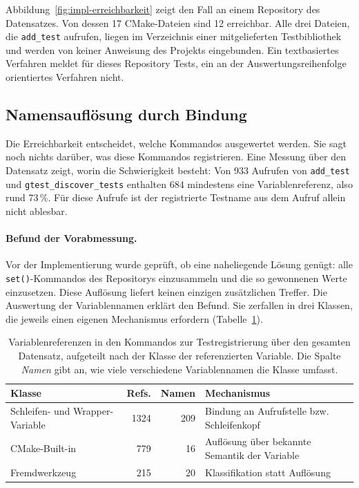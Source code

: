 \documentclass[12pt,a4paper,twoside,headsepline,parskip=half]{scrreprt}
\begin{document}
Abbildung~\ref{fig:impl-erreichbarkeit} zeigt den Fall an einem Repository des
Datensatzes. Von dessen 17 CMake-Dateien sind 12 erreichbar. Alle drei Dateien, die
\texttt{add\_test} aufrufen, liegen im Verzeichnis einer mitgelieferten Testbibliothek
und werden von keiner Anweisung des Projekts eingebunden. Ein textbasiertes Verfahren
meldet für dieses Repository Tests, ein an der Auswertungsreihenfolge orientiertes
Verfahren nicht.

\subsection{Namensauflösung durch Bindung}
\label{sec:impl-bindung}

Die Erreichbarkeit entscheidet, welche Kommandos ausgewertet werden. Sie sagt noch
nichts darüber, was diese Kommandos registrieren. Eine Messung über den Datensatz
zeigt,
worin die Schwierigkeit besteht: Von 933 Aufrufen von \texttt{add\_test} und
\texttt{gtest\_discover\_tests} enthalten 684 mindestens eine Variablenreferenz, also
rund 73\,\%. Für diese Aufrufe ist der registrierte Testname aus dem Aufruf allein
nicht ablesbar.

\paragraph{Befund der Vorabmessung.}
Vor der Implementierung wurde geprüft, ob eine naheliegende Lösung genügt: alle
\texttt{set()}-Kommandos des Repositorys einzusammeln und die so gewonnenen Werte
einzusetzen. Diese Auflösung liefert keinen einzigen zusätzlichen Treffer. Die
Auswertung der Variablennamen erklärt den Befund. Sie zerfallen in drei Klassen, die
jeweils einen eigenen Mechanismus erfordern (Tabelle~\ref{tab:impl-variablen}).

\begin{table}[H]
    \centering
    \small
    \begin{tabularx}{\textwidth}{l r r X}
        \toprule
        \textbf{Klasse} & \textbf{Refs.} & \textbf{Namen} & \textbf{Mechanismus} \\
        \midrule
        Schleifen- und Wrapper-Variable & 1324 & 209 &
            Bindung an Aufrufstelle bzw. Schleifenkopf \\
        CMake-Built-in & 779 & 16 &
            Auflösung über bekannte Semantik der Variable \\
        Fremdwerkzeug & 215 & 20 &
            Klassifikation statt Auflösung \\
        \bottomrule
    \end{tabularx}
    \caption{Variablenreferenzen in den Kommandos zur Testregistrierung über den
    gesamten Datensatz, aufgeteilt nach der Klasse der referenzierten Variable. Die Spalte \emph{Namen}
    gibt an, wie viele verschiedene Variablennamen die Klasse umfasst.}
    \label{tab:impl-variablen}
\end{table}
\end{document}
